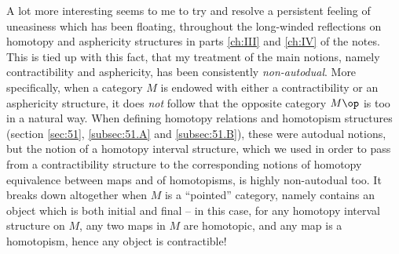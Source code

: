 \enspace A lot more interesting seems to me to
try and resolve a persistent feeling of uneasiness which has been
floating, throughout the long-winded reflections on homotopy and
asphericity structures in parts \ref{ch:III} and \ref{ch:IV} of the
notes. This is tied up with this fact, that my treatment of the main
notions, namely contractibility and asphericity, has been consistently
\emph{non-autodual}. More specifically, when a category $M$ is
endowed with either a contractibility or an asphericity structure, it
does \emph{not} follow that the opposite category $M\op$ is too in a
natural way. When defining homotopy relations and homotopism
structures (section \ref{sec:51}, \ref{subsec:51.A} and
\ref{subsec:51.B}), these were autodual notions, but the notion of a
homotopy interval structure, which we used in order to pass from a
contractibility structure to the corresponding notions of
homotopy equivalence between maps and of homotopisms, is highly
non-autodual too. It breaks down altogether when $M$ is a ``pointed''
category, namely contains an object which is both initial and final --
in this case, for any homotopy interval structure on $M$, any two maps
in $M$ are homotopic, and any map is a homotopism, hence any object is
contractible!

